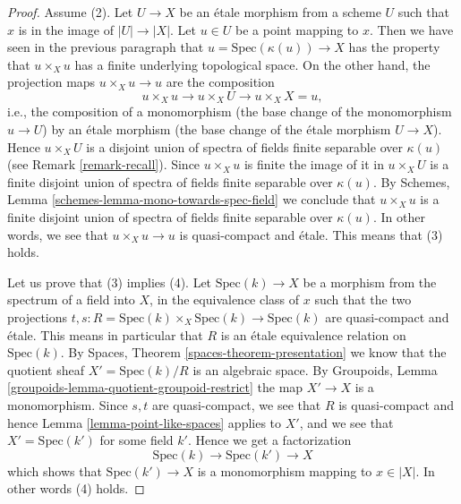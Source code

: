 \begin{proof}
\medskip\noindent
Assume (2). Let $U \to X$ be an \'etale morphism from a scheme $U$
such that $x$ is in the image of $|U| \to |X|$. Let $u \in U$ be
a point mapping to $x$. Then we have seen in the previous
paragraph that $u = \text{Spec}(\kappa(u)) \to X$ has the property that
$u \times_X u$ has a finite underlying topological space. On the other
hand, the projection maps $u \times_X u \to u$ are the composition
$$
u \times_X u \longrightarrow
u \times_X U \longrightarrow
u \times_X X = u,
$$
i.e., the composition of a monomorphism (the base change of the monomorphism
$u \to U$) by an \'etale morphism (the base change of the \'etale morphism
$U \to X$). Hence $u \times_X U$ is a disjoint union of spectra of fields
finite separable over $\kappa(u)$ (see
Remark \ref{remark-recall}). Since $u \times_X u$ is finite the image
of it in $u \times_X U$ is a finite disjoint union of spectra of fields
finite separable over $\kappa(u)$. By
Schemes, Lemma \ref{schemes-lemma-mono-towards-spec-field}
we conclude that $u \times_X u$ is a finite disjoint union of spectra
of fields finite separable over $\kappa(u)$. In other words, we see that
$u \times_X u \to u$ is quasi-compact and \'etale. This means that (3) holds.

\medskip\noindent
Let us prove that (3) implies (4). Let $\text{Spec}(k) \to X$ be a morphism
from the spectrum of a field into $X$, in the equivalence class of $x$
such that the two projections
$t, s : R = \text{Spec}(k) \times_X \text{Spec}(k)  \to \text{Spec}(k)$
are quasi-compact and \'etale.
This means in particular
that $R$ is an \'etale equivalence relation on $\text{Spec}(k)$.
By Spaces, Theorem \ref{spaces-theorem-presentation}
we know that the quotient sheaf
$X' = \text{Spec}(k)/R$ is an algebraic space. By
Groupoids, Lemma \ref{groupoids-lemma-quotient-groupoid-restrict}
the map $X' \to X$ is a monomorphism.
Since $s, t$ are quasi-compact, we see that $R$ is quasi-compact and hence
Lemma \ref{lemma-point-like-spaces} applies to $X'$, and we see that
$X' = \text{Spec}(k')$ for some field $k'$. Hence we get a factorization
$$
\text{Spec}(k) \longrightarrow
\text{Spec}(k') \longrightarrow X
$$
which shows that $\text{Spec}(k') \to X$ is a monomorphism mapping
to $x \in |X|$. In other words (4) holds.


\end{proof}
